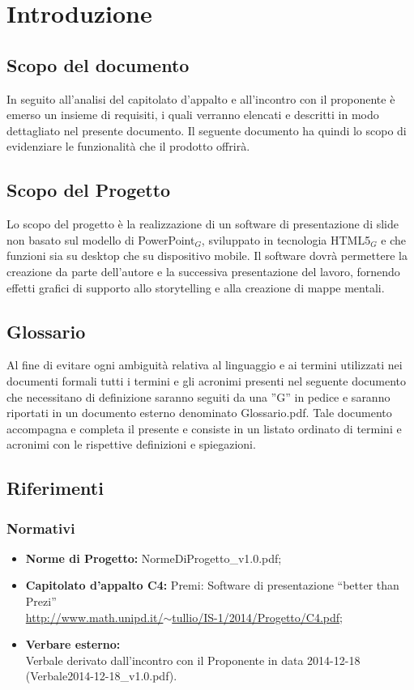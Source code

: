 \section{Introduzione}

\subsection{Scopo del documento}
In seguito all'analisi del capitolato d'appalto e all'incontro con il proponente è emerso un insieme di requisiti, i quali verranno elencati e descritti in modo dettagliato nel presente documento.
Il seguente documento ha quindi lo scopo di evidenziare le funzionalità che il prodotto offrirà.

\subsection{Scopo del Progetto}
Lo scopo del progetto è la realizzazione di un software di presentazione di slide non basato sul modello di PowerPoint$_{G}$, sviluppato in tecnologia HTML5$_{G}$ e che funzioni sia su desktop che su dispositivo mobile. Il software dovrà permettere la creazione da parte dell'autore e la successiva presentazione del lavoro, fornendo effetti grafici di supporto allo storytelling e alla creazione di mappe mentali. 

\subsection{Glossario}
Al fine di evitare ogni ambiguità relativa al linguaggio e ai termini utilizzati nei documenti formali tutti i termini e gli acronimi presenti nel seguente documento che necessitano di definizione saranno seguiti da una ”G” in pedice e saranno riportati in un documento esterno denominato Glossario.pdf. Tale documento accompagna e completa il presente e consiste in un listato ordinato di termini e acronimi con le rispettive definizioni e spiegazioni.

\subsection{Riferimenti}
\subsubsection{Normativi}
\begin{itemize}
	\item \textbf{Norme di Progetto:} NormeDiProgetto\_v1.0.pdf;
	\item \textbf{Capitolato d’appalto C4:} Premi: Software di presentazione ``better than Prezi''\\ \href{http://www.math.unipd.it/~tullio/IS-1/2014/Progetto/C4.pdf}{http://www.math.unipd.it/$\sim$tullio/IS-1/2014/Progetto/C4.pdf};
	\item \textbf{Verbare esterno:} \\ 
		Verbale derivato dall'incontro con il Proponente in data 2014-12-18 (Verbale2014-12-18\_v1.0.pdf).
\end{itemize}

